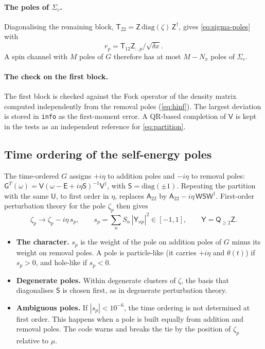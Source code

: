 \documentclass[11pt,a4paper]{article}
\newcommand{\code}[1]{\texttt{#1}}
\newcommand{\dx}{\delta x}
\newcommand{\mat}[1]{\mathsf{#1}}
\newcommand{\Nx}{N_x}
\begin{document}
\paragraph{The poles of $\Sigma_c$.} Diagonalising the remaining block, $\mat T_{22} = \mat Z\,\mathrm{diag}(\zeta)\,\mat Z^\dagger$, gives \cref{eq:sigma-poles} with
\begin{equation}
r_p = \mat T_{12}\mat Z_{:,p}/\sqrt{\dx}.
\end{equation}
A spin channel with $M$ poles of $G$ therefore has at most $M-\Nx$ poles of $\Sigma_c$.

\paragraph{The check on the first block.} The first block is checked against the Fock operator of the density matrix computed independently from the removal poles (\cref{eq:hinf}). The largest deviation is stored in \code{info} as the first-moment error. A QR-based completion of $\mat V$ is kept in the tests as an independent reference for \cref{eq:partition}.

\subsection{Time ordering of the self-energy poles}
\label{sec:character}

The time-ordered $G$ assigns $+i\eta$ to addition poles and $-i\eta$ to removal poles: $\mat G^T(\omega) = \mat V(\omega-\mat E+i\eta\mat S)^{-1}\mat V^\dagger$, with $\mat S = \mathrm{diag}(\pm1)$. Repeating the partition with the same $\mat U$, to first order in $\eta$, replaces $\mat A_{22}$ by $\mat A_{22}-i\eta\,\mat W\mat S\mat W^\dagger$. First-order perturbation theory for the pole $\zeta_p$ then gives
\begin{equation}
\zeta_p \to \zeta_p - i\eta\,s_p, \qquad s_p = \sum_n S_n\,|\mat Y_{np}|^2\in[-1,1], \qquad \mat Y = \mat Q_{\ge2}\mat Z.
\end{equation}
\begin{itemize}
\item \textbf{The character.} $s_p$ is the weight of the pole on addition poles of $G$ minus its weight on removal poles. A pole is particle-like (it carries $+i\eta$ and $\theta(t)$) if $s_p>0$, and hole-like if $s_p<0$.
\item \textbf{Degenerate poles.} Within degenerate clusters of $\zeta$, the basis that diagonalises $\mat S$ is chosen first, as in degenerate perturbation theory.
\item \textbf{Ambiguous poles.} If $|s_p|<10^{-6}$, the time ordering is not determined at first order. This happens when a pole is built equally from addition and removal poles. The code warns and breaks the tie by the position of $\zeta_p$ relative to $\mu$.
\end{itemize}
\end{document}
